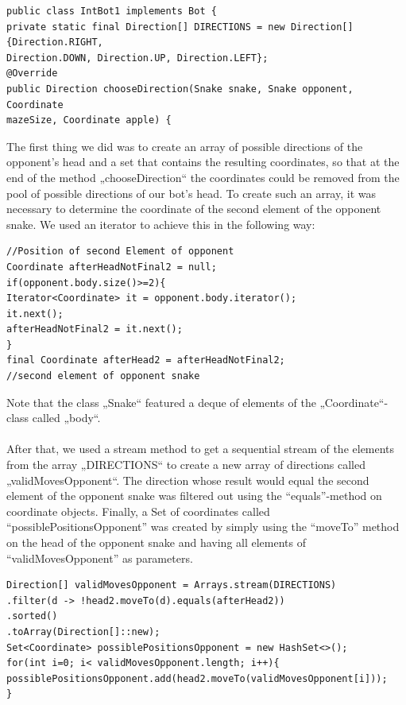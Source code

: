 \documentclass[a4paper,12pt]{article}
\begin{document}
\begin{verbatim}
public class IntBot1 implements Bot {
private static final Direction[] DIRECTIONS = new Direction[]{Direction.RIGHT,
Direction.DOWN, Direction.UP, Direction.LEFT};
@Override
public Direction chooseDirection(Snake snake, Snake opponent, Coordinate
mazeSize, Coordinate apple) {
\end{verbatim}
The first thing we did was to create an array of possible directions of the opponent’s head and a set
that contains the resulting coordinates, so that at the end of the method „chooseDirection“ the
coordinates could be removed from the pool of possible directions of our bot’s head. To create such
an array, it was necessary to determine the coordinate of the second element of the opponent snake.
We used an iterator to achieve this in the following way:\\
\begin{verbatim}
//Position of second Element of opponent
Coordinate afterHeadNotFinal2 = null;
if(opponent.body.size()>=2){
Iterator<Coordinate> it = opponent.body.iterator();
it.next();
afterHeadNotFinal2 = it.next();
}
final Coordinate afterHead2 = afterHeadNotFinal2;
//second element of opponent snake
\end{verbatim}
Note that the class „Snake“ featured a deque of elements of the „Coordinate“-class called „body“.\\
\\
After that, we used a stream method to get a sequential stream of the elements from the array
„DIRECTIONS“ to create a new array of directions called „validMovesOpponent“. The direction
whose result would equal the second element of the opponent snake was filtered out using the “equals”-method on coordinate objects. Finally, a Set of coordinates called
“possiblePositionsOpponent” was created by simply using the “moveTo” method on the head of the
opponent snake and having all elements of “validMovesOpponent” as parameters.
\begin{verbatim}
Direction[] validMovesOpponent = Arrays.stream(DIRECTIONS)
.filter(d -> !head2.moveTo(d).equals(afterHead2))
.sorted()
.toArray(Direction[]::new);
Set<Coordinate> possiblePositionsOpponent = new HashSet<>();
for(int i=0; i< validMovesOpponent.length; i++){
possiblePositionsOpponent.add(head2.moveTo(validMovesOpponent[i]));
}
\end{verbatim}
\end{document}
